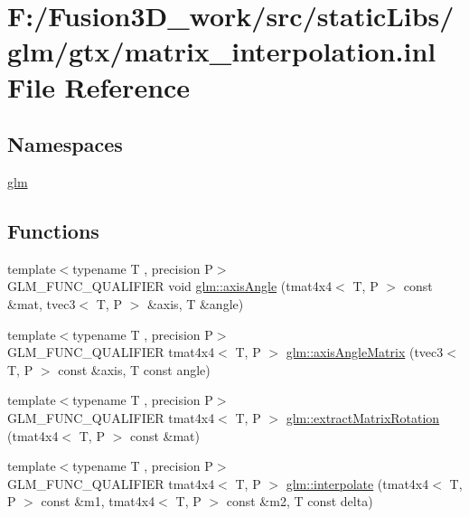 \hypertarget{matrix__interpolation_8inl}{}\section{F\+:/\+Fusion3\+D\+\_\+work/src/static\+Libs/glm/gtx/matrix\+\_\+interpolation.inl File Reference}
\label{matrix__interpolation_8inl}
\subsection*{Namespaces}
\begin{DoxyCompactItemize}
\item 
 \hyperlink{namespaceglm}{glm}
\end{DoxyCompactItemize}
\subsection*{Functions}
\begin{DoxyCompactItemize}
\item 
{\footnotesize template$<$typename T , precision P$>$ }\\G\+L\+M\+\_\+\+F\+U\+N\+C\+\_\+\+Q\+U\+A\+L\+I\+F\+I\+E\+R void \hyperlink{group__gtx__matrix__interpolation_ga9aef292eb5f29bdbb58a53ef4281af92}{glm\+::axis\+Angle} (tmat4x4$<$ T, P $>$ const \&mat, tvec3$<$ T, P $>$ \&axis, T \&angle)
\item 
{\footnotesize template$<$typename T , precision P$>$ }\\G\+L\+M\+\_\+\+F\+U\+N\+C\+\_\+\+Q\+U\+A\+L\+I\+F\+I\+E\+R tmat4x4$<$ T, P $>$ \hyperlink{group__gtx__matrix__interpolation_ga82d4bc058e9628cb2ea1d4e117a0cf39}{glm\+::axis\+Angle\+Matrix} (tvec3$<$ T, P $>$ const \&axis, T const angle)
\item 
{\footnotesize template$<$typename T , precision P$>$ }\\G\+L\+M\+\_\+\+F\+U\+N\+C\+\_\+\+Q\+U\+A\+L\+I\+F\+I\+E\+R tmat4x4$<$ T, P $>$ \hyperlink{group__gtx__matrix__interpolation_ga6b8170aa4cf43caf81400696ebb38afe}{glm\+::extract\+Matrix\+Rotation} (tmat4x4$<$ T, P $>$ const \&mat)
\item 
{\footnotesize template$<$typename T , precision P$>$ }\\G\+L\+M\+\_\+\+F\+U\+N\+C\+\_\+\+Q\+U\+A\+L\+I\+F\+I\+E\+R tmat4x4$<$ T, P $>$ \hyperlink{group__gtx__matrix__interpolation_ga45099a92c5c704503565619ac2bcd5c6}{glm\+::interpolate} (tmat4x4$<$ T, P $>$ const \&m1, tmat4x4$<$ T, P $>$ const \&m2, T const delta)
\end{DoxyCompactItemize}
